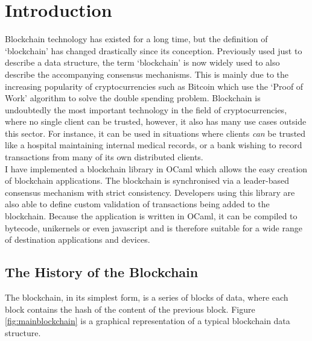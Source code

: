 \documentclass[12pt,a4paper,twoside,openright]{report}
\begin{document}
	\chapter{Introduction}
	Blockchain technology has existed for a long time, but the definition of `blockchain' has changed drastically since its conception.
	Previously used just to describe a data structure, the term `blockchain' is now widely used to also describe the accompanying consensus mechanisms.
	This is mainly due to the increasing popularity of cryptocurrencies such as Bitcoin \cite{Bitcoin} which use the `Proof of Work' algorithm to solve the double spending problem.
	Blockchain is undoubtedly the most important technology in the field of cryptocurrencies, where no single client can be trusted, however, it also has many use cases outside this sector.
	For instance, it can be used in situations where clients \textit{can} be trusted like a hospital maintaining internal medical records, or a bank wishing to record transactions from many of its own distributed clients.\\
	
	I have implemented a blockchain library in OCaml which allows the easy creation of blockchain applications.
	The blockchain is synchronised via a leader-based consensus mechanism with strict consistency.
	Developers using this library are also able to define custom validation of transactions being added to the blockchain.
	Because the application is written in OCaml, it can be compiled to bytecode, unikernels or even javascript and is therefore suitable for a wide range of destination applications and devices.

	\section{The History of the Blockchain}
	The blockchain, in its simplest form, is a series of blocks of data, where each block contains the hash of the content of the previous block. 
	Figure \ref{fig:mainblockchain} is a graphical representation of a typical blockchain data structure.\\
\end{document}
